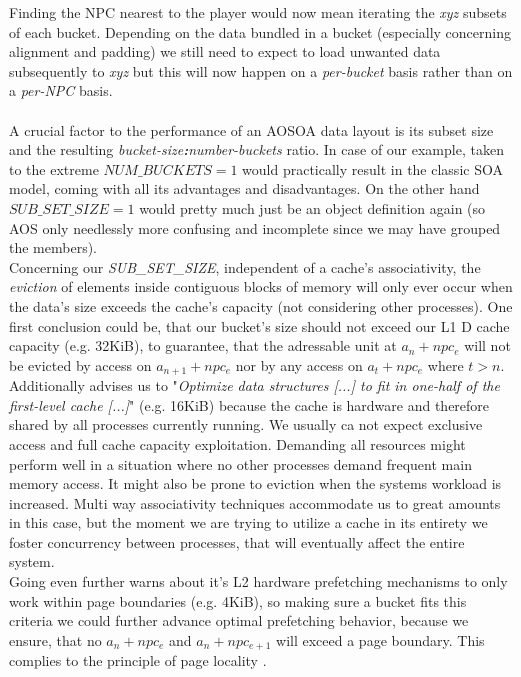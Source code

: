 Finding the NPC nearest to the player would now mean iterating the \textit{xyz} subsets of each bucket. Depending on the data bundled in a bucket (especially concerning alignment and padding) we still need to expect to load unwanted data subsequently to \textit{xyz} but this will now happen on a \textit{per-bucket} basis rather than on a \textit{per-NPC} basis.\\\\
A crucial factor to the performance of an AOSOA data layout is its subset size and the resulting \textit{bucket-size\textbf{:}number-buckets} ratio. In case of our  example, taken to the extreme $\textit{NUM\_BUCKETS}=1$ would practically result in the classic SOA model, coming with all its advantages and disadvantages. On the other hand $\textit{SUB\_SET\_SIZE}=1$ would pretty much just be an object definition again (so AOS only needlessly more confusing and incomplete since we may have grouped the members).\\
Concerning our \textit{SUB\_SET\_SIZE}, independent of a cache's associativity, the \textit{eviction} of elements inside contiguous blocks of memory  will only ever occur when the data's size exceeds the cache's capacity (not considering other processes). One first conclusion could be, that our bucket's size should not exceed our L1 D cache capacity (e.g. 32KiB), to guarantee, that the adressable unit at $a_n + npc_e$ will not be evicted by access on $a_{n+1}+npc_e$ nor by any access on $a_t+npc_e$ where $t > n$.\\
Additionally  advises us to "\textit{Optimize data structures [...] to fit in one-half of the first-level cache [...]}" (e.g. 16KiB) because the cache is hardware and therefore shared by all processes currently running. We usually ca not expect exclusive access and full cache capacity exploitation. Demanding all resources might perform well in a situation where no other processes demand frequent main memory access. It might also be prone to eviction when the systems workload is increased. Multi way associativity techniques accommodate us to great amounts in this case, but the moment we are trying to utilize a cache in its entirety we foster concurrency between processes, that will eventually affect the entire system.\\
Going even further  warns about it's L2 hardware prefetching mechanisms to only work within page boundaries (e.g. 4KiB), so making sure a bucket fits this criteria we could further advance optimal prefetching behavior, because we ensure, that no $a_n+npc_e$ and $a_n+npc_{e+1}$ will exceed a page boundary. This complies to the principle of page locality .\\
